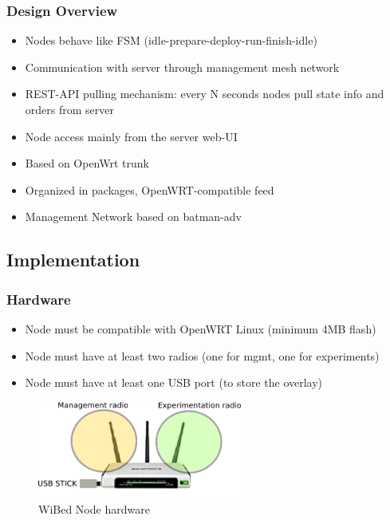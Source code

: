 \documentclass[usepdftitle=false,13pt]{beamer}
\begin{document}
\begin{frame}\frametitle{Design Overview}

	\begin{itemize}
		\item Nodes behave like FSM (idle-prepare-deploy-run-finish-idle)
		\item Communication with server through management mesh network
		\item REST-API pulling mechanism: every N seconds nodes pull state info and orders from server
		\item Node access mainly from the server web-UI
		\item Based on OpenWrt trunk
		\item Organized in packages, OpenWRT-compatible feed
		\item Management Network based on batman-adv 
	\end{itemize}
\end{frame}


\subsection{Implementation}

\begin{frame}\frametitle{Hardware}

	\begin{itemize}
	\item Node must be compatible with OpenWRT Linux (minimum 4MB flash)
	\item Node must have at least two radios (one for mgmt, one for experiments)
	\item Node must have at least one USB port (to store the overlay)
	\end{itemize}

	\begin{figure}[h!]
	\begin{center}
	\includegraphics[width=0.6\textwidth]{pic/nodehw}
	  \caption{WiBed Node hardware}
	\label{fig:funct}
	\end{center}
	\end{figure}
\end{frame}
\end{document}
